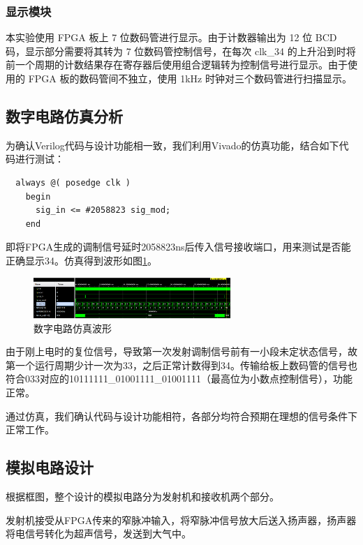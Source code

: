 \documentclass[a4paper, twocolumn]{ctexart}
\begin{document}
\subsubsection{显示模块}

本实验使用 FPGA 板上 7 位数码管进行显示。由于计数器输出为 12 位 BCD 码，显示部分需要将其转为 7 位数码管控制信号，在每次 clk\_34 的上升沿到时将前一个周期的计数结果存在寄存器后使用组合逻辑转为控制信号进行显示。由于使用的 FPGA 板的数码管间不独立，使用 1kHz 时钟对三个数码管进行扫描显示。

\subsection{数字电路仿真分析}

为确认Verilog代码与设计功能相一致，我们利用Vivado的仿真功能，结合如下代码进行测试：

\begin{verbatim}
  always @( posedge clk )
    begin
      sig_in <= #2058823 sig_mod;
    end
\end{verbatim}

即将FPGA生成的调制信号延时2058823ns后传入信号接收端口，用来测试是否能正确显示34。仿真得到波形如图\ref{fig:digital_sim}。

\begin{figure}[ht]
    \centering
    \includegraphics[width=7.5cm]{../assets/仿真.png}
    \caption{数字电路仿真波形}
    \label{fig:digital_sim}
\end{figure}

由于刚上电时的复位信号，导致第一次发射调制信号前有一小段未定状态信号，故第一个运行周期少计一次为33，之后正常计数得到34。传输给板上数码管的信号也符合033对应的10111111\_01001111\_01001111（最高位为小数点控制信号），功能正常。

通过仿真，我们确认代码与设计功能相符，各部分均符合预期在理想的信号条件下正常工作。

\subsection{模拟电路设计}

根据框图，整个设计的模拟电路分为发射机和接收机两个部分。

发射机接受从FPGA传来的窄脉冲输入，将窄脉冲信号放大后送入扬声器，扬声器将电信号转化为超声信号，发送到大气中。
\end{document}
